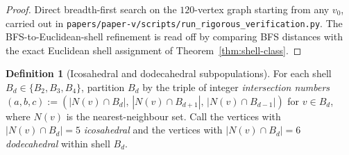 \documentclass[11pt, a4paper]{amsart}
\theoremstyle{definition}
\newtheorem{definition}[theorem]{Definition}
\begin{document}
\begin{proof}
Direct breadth-first search on the $120$-vertex graph starting
from any $v_0$, carried out in
\verb|papers/paper-v/scripts/run_rigorous_verification.py|. The
BFS-to-Euclidean-shell refinement is read off by comparing BFS
distances with the exact Euclidean shell assignment of
Theorem~\ref{thm:shell-class}.
\end{proof}

\begin{definition}[Icosahedral and dodecahedral subpopulations]
\label{def:ico-dod}
For each shell $B_d \in \{B_2, B_3, B_4\}$, partition $B_d$ by the
triple of integer \emph{intersection numbers} $(a, b, c) :=
(|N(v) \cap B_d|,\, |N(v) \cap B_{d+1}|,\, |N(v) \cap B_{d-1}|)$
for $v \in B_d$, where $N(v)$ is the nearest-neighbour set. Call
the vertices with $|N(v) \cap B_d| = 5$ \emph{icosahedral} and
the vertices with $|N(v) \cap B_d| = 6$ \emph{dodecahedral}
within shell $B_d$.
\end{definition}
\end{document}

